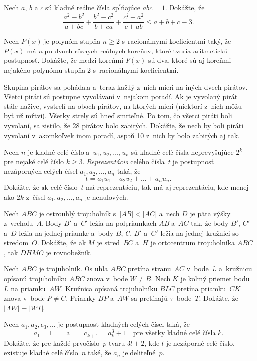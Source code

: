 {%
Nech $a$, $b$ a $c$ sú kladné reálne čísla spĺňajúce $abc=1$. Dokážte, že
$$\frac{a^2-b^2}{a+bc}+\frac{b^2-c^2}{b+ca}+\frac{c^2-a^2}{c+ab}\leq a+b+c-3.$$
}

{%
Nech $P(x)$ je polynóm stupňa $n\ge 2$ s~racionálnymi koeficientmi taký, že $P(x)$ má
$n$ po dvoch rôznych reálnych koreňov, ktoré tvoria aritmetickú postupnosť. Dokážte, že medzi koreňmi $P(x)$ sú dva, ktoré sú aj koreňmi nejakého polynómu stupňa 2 s~racionálnymi koeficientmi.
}

{%
Skupina pirátov sa pohádala a~teraz každý z~nich mieri na iných dvoch pirátov. Všetci piráti sú postupne vyvolávaní v~nejakom poradí. Ak je vyvolaný pirát stále nažive, vystrelí na oboch pirátov, na ktorých mieri (niektorí z~nich môžu byť už mŕtvi). Všetky strely sú hneď smrteľné. Po tom, čo všetci piráti boli vyvolaní, sa zistilo, že 28 pirátov bolo zabitých. Dokážte, že nech by boli piráti vyvolaní v~akomkoľvek inom poradí, aspoň 10 z~nich by bolo zabitých aj tak.
}

{%
Nech $n$ je kladné celé číslo a~$u_1,u_2,\dots,u_n$ sú kladné celé čísla neprevyšujúce $2^k$ pre nejaké celé číslo $k\ge 3$. {\it Reprezentácia\/} celého čísla~$t$ je postupnosť nezáporných celých čísel $a_1,a_2,\dots,a_n$ taká, že
$$
t=a_1u_1+a_2u_2+\dots+a_nu_n.
$$
Dokážte, že ak celé číslo~$t$ má reprezentáciu, tak má aj reprezentáciu, kde menej ako $2k$ z~čísel $a_1,a_2,\dots,a_n$ je nenulových.
}

{%
Nech $ABC$ je ostrouhlý trojuholník s~$|AB|<|AC|$ a~nech $D$ je päta výšky z~vrcholu~$A$. Body $B'$ a~$C'$ ležia na polpriamkach $AB$ a~$AC$ tak, že body $B'$, $C'$ a~$D$ ležia na jednej priamke a~body $B$, $C$, $B'$ a~$C'$ ležia na jednej kružnici so stredom~$O$. Dokážte, že ak $M$ je stred~$BC$ a~$H$ je ortocentrum trojuholníka $ABC$, tak $DHMO$ je rovnobežník.
}

{%
Nech $ABC$ je trojuholník. Os uhla $ABC$ pretína stranu~$AC$ v~bode~$L$ a~kružnicu opísanú trojuholníku $ABC$ znova v~bode $W\ne B$. Nech $K$ je kolmý priemet bodu~$L$ na priamku~$AW$. Kružnica opísaná trojuholníku $BLC$ pretína priamku~$CK$ znova v~bode $P\ne C$. Priamky $BP$ a~$AW$ sa pretínajú v~bode~$T$. Dokážte, že $|AW| = |WT|$.}

{%
Nech $a_1,a_2,a_3,\dots$ je postupnosť kladných celých čísel taká, že
$$
a_1=1\qquad\text{a}\qquad a_{k+1}=a_k^3+1\quad\text{pre všetky kladné celé čísla $k$.}
$$
Dokážte, že pre každé prvočíslo~$p$ tvaru $3l+2$, kde $l$ je nezáporné celé číslo, existuje kladné celé číslo~$n$ také, že $a_n$ je deliteľné~$p$.
}

